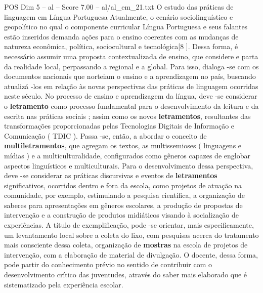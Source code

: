 \begin{textsample}{POS Dim 5 – al – Score 7.00 – al/al\_em\_21.txt}  \label{ex:f5_pos_048}
O estudo das práticas de linguagem em Língua Portuguesa Atualmente, o cenário sociolinguístico e geopolítico no qual o componente curricular Língua Portuguesa e seus falantes estão inseridos demanda ações para o ensino coerentes com as mudanças de natureza econômica, política, sociocultural e tecnológica[8 ].
Dessa forma, é necessário assumir uma proposta contextualizada de ensino, que considere e parta da realidade local, perpassando a regional e a global.
Para isso, dialoga -se com os documentos nacionais que norteiam o ensino e a aprendizagem no país, buscando atualizá -los em relação às novas perspectivas das práticas de linguagem ocorridas neste século.
No processo de ensino e aprendizagem da língua, deve -se considerar o \textbf{letramento} como processo fundamental para o desenvolvimento da leitura e da escrita nas práticas sociais ; assim como os novos \textbf{letramentos}, resultantes das transformações proporcionadas pelas Tecnologias Digitais de Informação e Comunicação ( TDIC ).
Passa -se, então, a abordar o conceito de \textbf{multiletramentos}, que agregam os textos, as multissemioses ( linguagens e mídias ) e a multiculturalidade, configurados como gêneros capazes de englobar aspectos linguísticos e multiculturais.
Para o desenvolvimento dessa perspectiva, deve -se considerar as práticas discursivas e eventos de \textbf{letramentos} significativos, ocorridos dentro e fora da escola, como projetos de atuação na comunidade, por exemplo, estimulando a pesquisa científica, a organização de saberes para apresentações em gêneros escolares, a produção de propostas de intervenção e a construção de produtos midiáticos visando à socialização de experiências.
A título de exemplificação, pode -se orientar, mais especificamente, um levantamento local sobre a coleta do lixo, com pesquisas acerca do tratamento mais consciente dessa coleta, organização de \textbf{mostras} na escola de projetos de intervenção, com a elaboração de material de divulgação.
O docente, dessa forma, pode partir do conhecimento prévio no sentido de contribuir com o desenvolvimento crítico das juventudes, através do saber mais elaborado que é sistematizado pela experiência escolar.

\end{textsample}
